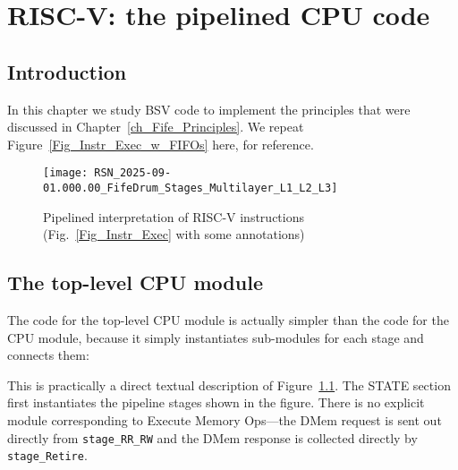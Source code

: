

\chapter{RISC-V: the {\FIFE} pipelined CPU code}


\setcounter{page}{1}
\renewcommand{\thepage}{\arabic{chapter}-\arabic{page}}

\label{ch_Fife_code}


\section{Introduction}

In this chapter we study BSV code to implement the principles that
were discussed in Chapter~\ref{ch_Fife_Principles}.
We repeat Figure~\ref{Fig_Instr_Exec_w_FIFOs} here, for reference.
\begin{figure}[htbp]
  \centerline{\texttt{[image: RSN\_2025-09-01.000.00\_FifeDrum\_Stages\_Multilayer\_L1\_L2\_L3]}}
  \caption{\label{Fig_Instr_Exec_w_FIFOs_2}
                  Pipelined interpretation of RISC-V instructions
		  (Fig.~\ref{Fig_Instr_Exec} with some annotations)}
\end{figure}


\section{The {\FIFE} top-level CPU module}

\label{Sec_Fife_CPU_module}

The code for the top-level {\FIFE} CPU module is actually simpler than
the code for the {\DRUM} CPU module, because it simply instantiates
sub-modules for each stage and connects them:


This is practically a direct textual description of
Figure~\ref{Fig_Instr_Exec_w_FIFOs_2}.  The STATE section first
instantiates the pipeline stages shown in the figure.  There is no
explicit module corresponding to Execute Memory Ops---the DMem request
is sent out directly from \verb|stage_RR_RW| and the DMem response is
collected directly by \verb|stage_Retire|.

